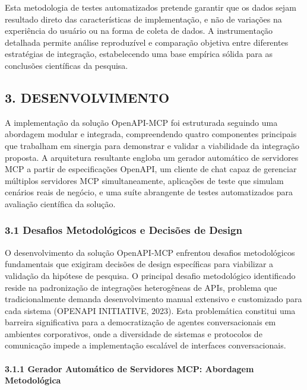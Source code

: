 \documentclass[
]{article}
\begin{document}
Esta metodologia de testes automatizados pretende garantir que os dados
sejam resultado direto das características de implementação, e não de
variações na experiência do usuário ou na forma de coleta de dados. A
instrumentação detalhada permite análise reproduzível e comparação
objetiva entre diferentes estratégias de integração, estabelecendo uma
base empírica sólida para as conclusões científicas da pesquisa.

\subsection{3. DESENVOLVIMENTO}\label{desenvolvimento}

A implementação da solução OpenAPI-MCP foi estruturada seguindo uma
abordagem modular e integrada, compreendendo quatro componentes
principais que trabalham em sinergia para demonstrar e validar a
viabilidade da integração proposta. A arquitetura resultante engloba um
gerador automático de servidores MCP a partir de especificações OpenAPI,
um cliente de chat capaz de gerenciar múltiplos servidores MCP
simultaneamente, aplicações de teste que simulam cenários reais de
negócio, e uma suíte abrangente de testes automatizados para avaliação
científica da solução.

\subsubsection{3.1 Desafios Metodológicos e Decisões de
Design}\label{desafios-metodoluxf3gicos-e-decisuxf5es-de-design}

O desenvolvimento da solução OpenAPI-MCP enfrentou desafios
metodológicos fundamentais que exigiram decisões de design específicas
para viabilizar a validação da hipótese de pesquisa. O principal desafio
metodológico identificado reside na padronização de integrações
heterogêneas de APIs, problema que tradicionalmente demanda
desenvolvimento manual extensivo e customizado para cada sistema
(OPENAPI INITIATIVE, 2023). Esta problemática constitui uma barreira
significativa para a democratização de agentes conversacionais em
ambientes corporativos, onde a diversidade de sistemas e protocolos de
comunicação impede a implementação escalável de interfaces
conversacionais.

\paragraph{3.1.1 Gerador Automático de Servidores MCP: Abordagem
Metodológica}\label{gerador-automuxe1tico-de-servidores-mcp-abordagem-metodoluxf3gica}
\end{document}
